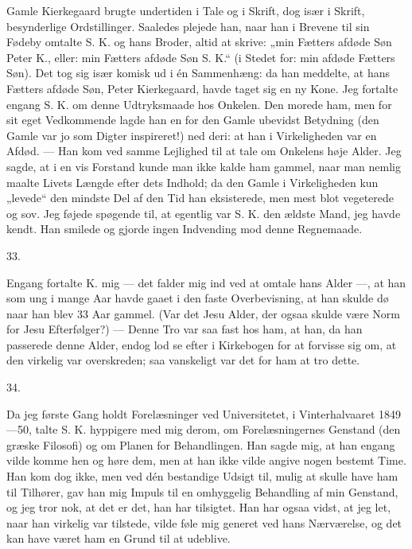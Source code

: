 \documentclass[12pt,a4paper,openany]{book}
\newcommand{\secnum}[1]{\par\begin{center}#1\end{center}\par\nobreak}
\newcommand{\opage}[1]{\marginnote{\footnotesize\textit{[#1]}}}
\begin{document}
Gamle Kierkegaard brugte undertiden i Tale og i
Skrift, dog især i Skrift, besynderlige Ordstillinger. Saaledes
plejede han, naar han i Brevene til sin Fødeby
omtalte S. K. og hans Broder, altid at skrive: „min
Fætters afdøde Søn Peter K., eller: min Fætters afdøde
Søn S. K.“ (i Stedet for: min afdøde Fætters Søn). Det
tog sig især komisk ud i én Sammenhæng: da han meddelte,
at hans Fætters afdøde Søn, Peter Kierkegaard,
havde taget sig en ny Kone. Jeg fortalte engang S. K.
om denne Udtryksmaade hos Onkelen. Den morede ham,
men for sit eget Vedkommende lagde han en for den
Gamle ubevidst Betydning (den Gamle var jo som Digter
inspireret!) ned deri: at han i Virkeligheden var en Afdød.
— Han kom ved samme Lejlighed til at tale om
Onkelens høje Alder. Jeg sagde, at i en vis Forstand
kunde man ikke kalde ham gammel, naar man nemlig
maalte Livets Længde efter dets Indhold; da den Gamle
i Virkeligheden kun „levede“ den mindste Del af den
\opage{361}Tid han eksisterede, men mest blot vegeterede og sov.
Jeg føjede spøgende til, at egentlig var S. K. den ældste
Mand, jeg havde kendt. Han smilede og gjorde ingen
Indvending mod denne Regnemaade.

\secnum{33.}

Engang fortalte K. mig — det falder mig ind ved
at omtale hans Alder —, at han som ung i mange Aar
havde gaaet i den faste Overbevisning, at han skulde
dø naar han blev 33 Aar gammel. (Var det Jesu Alder,
der ogsaa skulde være Norm for Jesu Efterfølger?) —
Denne Tro var saa fast hos ham, at han, da han passerede
denne Alder, endog lod se efter i Kirkebogen for
at forvisse sig om, at den virkelig var overskreden; saa
vanskeligt var det for ham at tro dette.

\secnum{34.}

Da jeg første Gang holdt Forelæsninger ved Universitetet,
i Vinterhalvaaret 1849—50, talte S. K. hyppigere
med mig derom, om Forelæsningernes Genstand (den
græske Filosofi) og om Planen for Behandlingen. Han
sagde mig, at han engang vilde komme hen og høre
dem, men at han ikke vilde angive nogen bestemt Time.
Han kom dog ikke, men ved dén bestandige Udsigt til,
mulig at skulle have ham til Tilhører, gav han mig Impuls
til en omhyggelig Behandling af min Genstand, og
jeg tror nok, at det er det, han har tilsigtet. Han har
ogsaa vidst, at jeg let, naar han virkelig var tilstede,
vilde føle mig generet ved hans Nærværelse, og det kan
have været ham en Grund til at udeblive.
\end{document}
